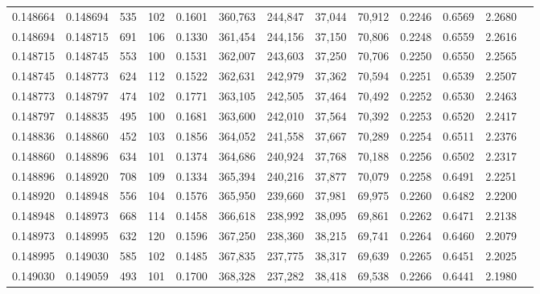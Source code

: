 \begin{tabular}{rrrrrrrrrrrrr}
0.148664 & 0.148694 &   535 & 102 &                                     0.1601 & 360,763 & 244,847 &  37,044 &  70,912 & 0.2246 & 0.6569 & 2.2680 \\
0.148694 & 0.148715 &   691 & 106 &                                     0.1330 & 361,454 & 244,156 &  37,150 &  70,806 & 0.2248 & 0.6559 & 2.2616 \\
0.148715 & 0.148745 &   553 & 100 &                                     0.1531 & 362,007 & 243,603 &  37,250 &  70,706 & 0.2250 & 0.6550 & 2.2565 \\
0.148745 & 0.148773 &   624 & 112 &                                     0.1522 & 362,631 & 242,979 &  37,362 &  70,594 & 0.2251 & 0.6539 & 2.2507 \\
0.148773 & 0.148797 &   474 & 102 &                                     0.1771 & 363,105 & 242,505 &  37,464 &  70,492 & 0.2252 & 0.6530 & 2.2463 \\
0.148797 & 0.148835 &   495 & 100 &                                     0.1681 & 363,600 & 242,010 &  37,564 &  70,392 & 0.2253 & 0.6520 & 2.2417 \\
0.148836 & 0.148860 &   452 & 103 &                                     0.1856 & 364,052 & 241,558 &  37,667 &  70,289 & 0.2254 & 0.6511 & 2.2376 \\
0.148860 & 0.148896 &   634 & 101 &                                     0.1374 & 364,686 & 240,924 &  37,768 &  70,188 & 0.2256 & 0.6502 & 2.2317 \\
0.148896 & 0.148920 &   708 & 109 &                                     0.1334 & 365,394 & 240,216 &  37,877 &  70,079 & 0.2258 & 0.6491 & 2.2251 \\
0.148920 & 0.148948 &   556 & 104 &                                     0.1576 & 365,950 & 239,660 &  37,981 &  69,975 & 0.2260 & 0.6482 & 2.2200 \\
0.148948 & 0.148973 &   668 & 114 &                                     0.1458 & 366,618 & 238,992 &  38,095 &  69,861 & 0.2262 & 0.6471 & 2.2138 \\
0.148973 & 0.148995 &   632 & 120 &                                     0.1596 & 367,250 & 238,360 &  38,215 &  69,741 & 0.2264 & 0.6460 & 2.2079 \\
0.148995 & 0.149030 &   585 & 102 &                                     0.1485 & 367,835 & 237,775 &  38,317 &  69,639 & 0.2265 & 0.6451 & 2.2025 \\
0.149030 & 0.149059 &   493 & 101 &                                     0.1700 & 368,328 & 237,282 &  38,418 &  69,538 & 0.2266 & 0.6441 & 2.1980 \\

\end{tabular}

